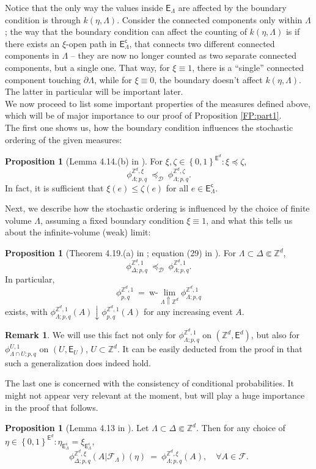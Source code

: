 \documentclass[12pt]{article}
\newcommand{\D}{\mathcal{D}}
\newcommand{\E}{\mathsf{E}}
\newcommand{\F}{\mathcal{F}}
\newcommand{\Z}{\mathbb{Z}}
\newcommand{\set}[1]{\left\{#1\right\}}
\newcommand{\1}{\mathbbm{1}}
\renewcommand{\c}{\mathsf{c}}
\newcommand{\5}{\vspace{0.5cm}}
\theoremstyle{definition}
\newtheorem{prop}[thm]{Proposition}
\newtheorem{rem}[thm]{Remark}
\begin{document}
Notice that the only way the values inside $\E_\Lambda$ are affected by the boundary condition is through $k(\eta,\Lambda)$. Consider the connected components only within $\Lambda$; the way that the boundary condition can affect the counting of $k(\eta,\Lambda)$ is if there exists an $\xi$-open path in $\E_\Lambda^\c$, that connects two different connected components in $\Lambda$ -- they are now no longer counted as two separate connected components, but a single one. That way, for $\xi\equiv 1$, there is a ``single'' connected component touching $\partial\Lambda$, while for $\xi\equiv 0$, the boundary doesn't affect $k(\eta,\Lambda)$. The latter in particular will be important later. \\

We now proceed to list some important properties of the measures defined above, which will be of major importance to our proof of Proposition \ref{FP:part1}.  \\

The first one shows us, how the boundary condition influences the stochastic ordering of the given measures:
\begin{prop}[Lemma 4.14.(b) in \cite{Gri}]\label{RC:boundarydomination}
For $\xi,\zeta\in\set{0,1}^{\E^d}:\xi\preceq\zeta$,
$$\phi_{\Lambda;p,q}^{\Z^d,\xi} ~\preceq_\D~ \phi_{\Lambda;p,q}^{\Z^d,\zeta}.$$
In fact, it is sufficient that $\xi(e)\leq\zeta(e)$ for all $e\in\E_\Lambda^\c$.
\end{prop}

Next, we describe how the stochastic ordering is influenced by the choice of finite volume $\Lambda$, assuming a fixed boundary condition $\xi\equiv 1$, and what this tells us about the infinite-volume (weak) limit:
\begin{prop}[Theorem 4.19.(a) in \cite{Gri}; equation (29) in \cite{GHM}]\label{RC:decr converg}
For $\Lambda\subset\Delta\Subset\Z^d$,
$$\phi_{\Delta;p,q}^{\Z^d,1} ~\preceq_\D~ \phi_{\Lambda;p,q}^{\Z^d,1}.$$
In particular,
$$\phi_{p,q}^{\Z^d,1} ~=~ \text{w-}\!\!\lim_{\Lambda\Uparrow\Z^d}\phi_{\Lambda;p,q}^{\Z^d,1}$$
exists, with $\phi_{\Lambda;p,q}^{\Z^d,1}(A)\downarrow\phi_{p,q}^{\Z^d,1}(A)$ for any increasing event $A$.
\end{prop}
\begin{rem}
We will use this fact not only for $\phi_{\Lambda;p,q}^{\Z^d,1}$ on $(\Z^d,\E^d)$, but also for $\phi_{\Lambda\cap U;p,q}^{U,1}$ on $(U,\E_U)$, $U\subset\Z^d$. It can be easily deducted from the proof in \cite{Gri} that such a generalization does indeed hold.
\end{rem}
The last one is concerned with the consistency of conditional probabilities. It might not appear very relevant at the moment, but will play a huge importance in the proof that follows.
\begin{prop}[Lemma 4.13 in \cite{Gri}]\label{RC:conditionalconsisteny}
Let $\Lambda\subset\Delta\Subset\Z^d$. Then for any choice of $\eta\in\set{0,1}^{\E^d}:\eta_{\E_\Lambda^\c}=\xi_{\E_\Lambda^\c}$,
$$\phi_{\Delta;p,q}^{\Z^d,\xi}(A|\F_\Lambda)(\eta) ~=~ \phi_{\Lambda;p,q}^{\Z^d,\xi}(A), \quad \forall A\in\F.$$
\end{prop}
\end{document}

